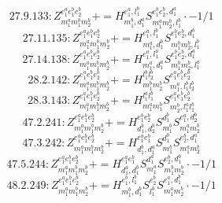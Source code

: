 \documentclass[letterpaper,10pt,fleqn,leqno,onecolumn]{article}
\begin{document}
\begin{equation} \;\;\;\;\;\;  27.9.133: Z^{e_{1}^{a}e_{1}^{b}e_{2}^{b}}_{m_{1}^{a}m_{1}^{b}m_{2}^{b}}+=H^{e_{1}^{a},l_{1}^{b}}_{m_{1}^{b},d_{1}^{a}}S^{e_{1}^{b}e_{2}^{b},d_{1}^{a}}_{m_{1}^{a}m_{2}^{b},l_{1}^{b}}\cdot -1/1 \end{equation}
\begin{equation} \;\;\;\;\;\;  27.11.135: Z^{e_{1}^{a}e_{1}^{b}e_{2}^{b}}_{m_{1}^{a}m_{1}^{b}m_{2}^{b}}+=H^{e_{1}^{a},l_{1}^{b}}_{m_{1}^{a},d_{1}^{b}}S^{e_{1}^{b}e_{2}^{b},d_{1}^{b}}_{m_{1}^{b}m_{2}^{b},l_{1}^{b}} \end{equation}
\begin{equation} \;\;\;\;\;\;  27.14.138: Z^{e_{1}^{a}e_{1}^{b}e_{2}^{b}}_{m_{1}^{a}m_{1}^{b}m_{2}^{b}}+=H^{e_{1}^{a},l_{1}^{a}}_{m_{1}^{a},d_{1}^{a}}S^{e_{1}^{b}e_{2}^{b},d_{1}^{a}}_{m_{1}^{b}m_{2}^{b},l_{1}^{a}} \end{equation}
\begin{equation} \;\;\;\;\;\;  28.2.142: Z^{e_{1}^{a}e_{1}^{b}e_{2}^{b}}_{m_{1}^{a}m_{1}^{b}m_{2}^{b}}+=H^{l_{1}^{b}l_{2}^{b}}_{m_{1}^{b}m_{2}^{b}}S^{e_{1}^{a}e_{1}^{b}e_{2}^{b}}_{m_{1}^{a},l_{1}^{b}l_{2}^{b}} \end{equation}
\begin{equation} \;\;\;\;\;\;  28.3.143: Z^{e_{1}^{a}e_{1}^{b}e_{2}^{b}}_{m_{1}^{a}m_{1}^{b}m_{2}^{b}}+=H^{l_{1}^{a}l_{1}^{b}}_{m_{1}^{a}m_{1}^{b}}S^{e_{1}^{a}e_{1}^{b}e_{2}^{b}}_{m_{2}^{b},l_{1}^{a}l_{1}^{b}} \end{equation}
\begin{equation} \;\;\;\;\;\;  47.2.241: Z^{e_{1}^{a}e_{1}^{b}e_{2}^{b}}_{m_{1}^{a}m_{1}^{b}m_{2}^{b}}+=H^{e_{1}^{b}e_{2}^{b}}_{d_{1}^{b},d_{2}^{b}}S^{d_{1}^{b}}_{m_{1}^{b}}S^{e_{1}^{a},d_{2}^{b}}_{m_{1}^{a}m_{2}^{b}} \end{equation}
\begin{equation} \;\;\;\;\;\;  47.3.242: Z^{e_{1}^{a}e_{1}^{b}e_{2}^{b}}_{m_{1}^{a}m_{1}^{b}m_{2}^{b}}+=H^{e_{1}^{a}e_{1}^{b}}_{d_{1}^{b},d_{1}^{a}}S^{d_{1}^{b}}_{m_{1}^{b}}S^{e_{2}^{b},d_{1}^{a}}_{m_{1}^{a}m_{2}^{b}} \end{equation}
\begin{equation} \;\;\;\;\;\;  47.5.244: Z^{e_{1}^{a}e_{1}^{b}e_{2}^{b}}_{m_{1}^{a}m_{1}^{b}m_{2}^{b}}+=H^{e_{1}^{a}e_{1}^{b}}_{d_{1}^{a},d_{1}^{b}}S^{d_{1}^{a}}_{m_{1}^{a}}S^{e_{2}^{b},d_{1}^{b}}_{m_{1}^{b}m_{2}^{b}}\cdot -1/1 \end{equation}
\begin{equation} \;\;\;\;\;\;  48.2.249: Z^{e_{1}^{a}e_{1}^{b}e_{2}^{b}}_{m_{1}^{a}m_{1}^{b}m_{2}^{b}}+=H^{e_{1}^{b},l_{1}^{b}}_{m_{1}^{b},d_{1}^{b}}S^{e_{2}^{b}}_{l_{1}^{b}}S^{e_{1}^{a},d_{1}^{b}}_{m_{1}^{a}m_{2}^{b}}\cdot -1/1 \end{equation}
\end{document}
